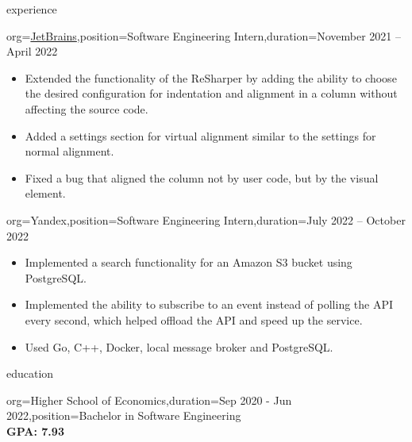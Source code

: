 \documentclass{resume}
\begin{document}
\begin{ResumeSection}{experience}
    \begin{ResumeSubsection}{org=\href{https://www.jetbrains.com/}{JetBrains},position={Software Engineering Intern},duration=November 2021 – April 2022}
        \begin{itemize}
            \item {
                Extended the functionality of the ReSharper by adding the ability to choose the desired configuration for indentation and alignment in a column without affecting the source code.
            }

            \item {
                Added a settings section for virtual alignment similar to the settings for normal alignment.
            }

            \item {
                Fixed a bug that aligned the column not by user code, but by the visual element.
            }
        \end{itemize}
    \end{ResumeSubsection}

    \begin{ResumeSubsection}{org=Yandex,position={Software Engineering Intern},duration=July 2022 – October 2022}
        \begin{itemize}
            \item {
                Implemented a search functionality for an Amazon S3 bucket using PostgreSQL.
            }

            \item {
                Implemented the ability to subscribe to an event instead of polling the API every second, which helped offload the API and speed up the service.
            }

            \item {
                Used Go, C++, Docker, local message broker and PostgreSQL.
            }
        \end{itemize}
    \end{ResumeSubsection}
\end{ResumeSection}

\begin{ResumeSection}{education}
    \begin{ResumeSubsection}{org={Higher School of Economics},duration={Sep 2020 - Jun 2022},position={Bachelor in Software Engineering}}
        \\\bf GPA: 7.93 
    \end{ResumeSubsection}
\end{ResumeSection}
\end{document}
